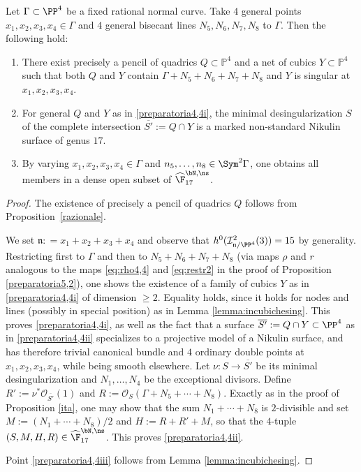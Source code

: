 \begin{prop}\label{preparatoria4,4}
Let $\Gamma\subset\PP^4$ be a fixed rational normal curve. Take $4$ general points $x_1,x_2,x_3,x_4\in \Gamma$ and $4$ general bisecant lines $N_5,N_6,N_7,N_8$ to $\Gamma$. Then the following hold:
\begin{enumerate}
\item\label{preparatoria4,4i}
There exist precisely a pencil of quadrics $Q \subset\mathbb P^4$ and a net of cubics $Y\subset\mathbb P^4$ such that both $Q$ and $Y$ contain $\Gamma+N_5+N_6+N_7+N_8$ and $Y$ is singular at $x_1,x_2,x_3,x_4$.
\item\label{preparatoria4,4ii}
For general $Q$ and $Y$ as in \eqref{preparatoria4,4i}, the minimal desingularization $S$ of the complete intersection $\overline{S'}:= Q\cap Y$ is a marked non-standard Nikulin surface of genus $17$.
\item\label{preparatoria4,4iii}
By varying $x_1,x_2,x_3,x_4\in \Gamma$ and $n_5,\ldots,n_8\in \Sym^2\Gamma$, one obtains all members in a dense open subset of $\widehat{\F}_{17}^{\bN,\ns}$.
\end{enumerate}
\end{prop}

\begin{proof}
The existence of precisely a pencil of quadrics $Q$ follows from Proposition~\ref{razionale}.

We set $\mathfrak{n}: = x_1 + x_2 + x_3 + x_4$ and observe that $h^0(\mathcal I^2_{\mathfrak{n}/\PP^4}(3))=15$ by generality. Restricting first to $\Gamma$ and then to $N_5+N_6+N_7+N_8$ (via maps $\rho$ and $r$ analogous to the maps \eqref{eq:rho4,4} and \eqref{eq:restr2} in the proof of Proposition \ref{preparatoria5,2}), one shows the existence of a family of cubics $Y$ as in \eqref{preparatoria4,4i} of dimension $\geq 2$. Equality holds, since it holds for nodes and lines (possibly in special position) as in Lemma \ref{lemma:incubichesing}. This proves \eqref{preparatoria4,4i}, as well as the fact that a surface $\overline{S'}:= Q\cap Y\subset \PP^4$ as in \eqref{preparatoria4,4ii} specializes to a projective model of a Nikulin surface, and has therefore trivial canonical bundle and $4$ ordinary double points at $x_1,x_2,x_3,x_4$, while being smooth elsewhere. Let $\nu:S\to \overline{S'}$ be its minimal desingularization and $N_1,\ldots,N_4$ be the exceptional divisors. Define $R':=\nu^*\mathcal O_{\overline{S'}}(1)$ and $R:=\mathcal{O}_{S}(\Gamma+N_5+\cdots+N_8)$. Exactly as in the proof of Proposition \ref{ita}, one may show that the sum $N_1+\cdots +N_8$ is $2$-divisible and set $M:=(N_1+\cdots +N_8)/2$ and $H:=R+R'+M$, so that the $4$-tuple $(S,M,H,R)\in \widehat{\F}_{17}^{\bN,\ns}$.
This proves \eqref{preparatoria4,4ii}.

Point \eqref{preparatoria4,4iii} follows from Lemma \ref{lemma:incubichesing}.
\end{proof}

